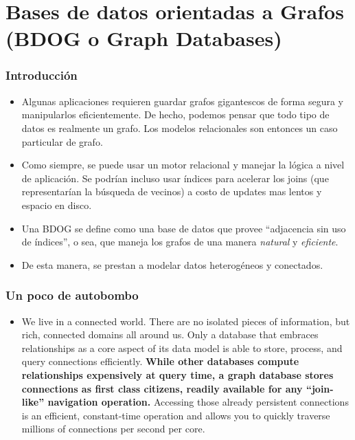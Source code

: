 \section{Bases de datos orientadas a Grafos (BDOG o Graph Databases)}

\begin{frame}
\frametitle{Introducción}
\begin{itemize}

\item	Algunas aplicaciones requieren guardar grafos gigantescos de
	forma segura y manipularlos eficientemente. \pause
	De hecho, podemos pensar que todo tipo de datos es realmente
	un grafo. Los modelos relacionales son entonces un caso
	particular de grafo.
	\pause

\item	Como siempre, se puede usar un motor relacional y manejar
	la lógica a nivel de aplicación. Se podrían incluso usar índices
	para acelerar los joins (que representarían la búsqueda de vecinos)
	a costo de updates mas lentos y espacio en disco.
	\pause

\item	Una BDOG se define como una base de datos que provee ``adjacencia
	sin uso de índices'', o sea, que maneja los grafos de una manera
	\textit{natural} y \textit{eficiente}.
	\pause

\item	De esta manera, se prestan a modelar datos heterogéneos y
	conectados.
\end{itemize}
\end{frame}

\begin{frame}
\frametitle{Un poco de autobombo}
\begin{itemize}
\item	We live in a connected world. There are no isolated pieces of
	information, but rich, connected domains all around us. Only a database
	that embraces relationships as a core aspect of its data model is able
	to store, process, and query connections efficiently. \textbf{While other
	databases compute relationships expensively at query time, a graph
	database stores connections as first class citizens, readily available
	for any “join-like” navigation operation.} Accessing those already
	persistent connections is an efficient, constant-time operation and
	allows you to quickly traverse millions of connections per second per
	core.
\end{itemize}
\end{frame}

